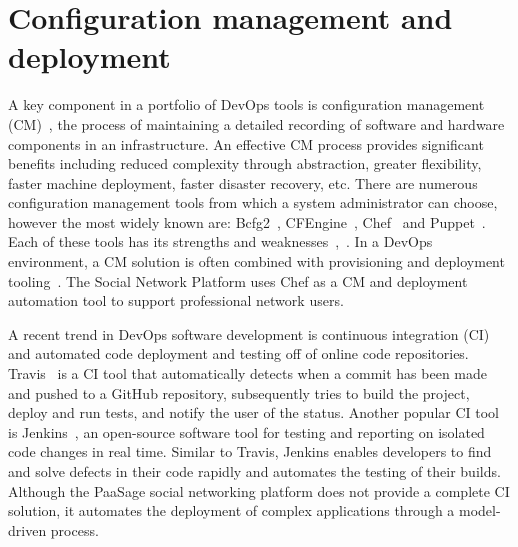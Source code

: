 \section{Configuration management and deployment}
A key component in a portfolio of DevOps tools is configuration management (CM)~\cite{lueninghoener2011getting}, the process of maintaining a detailed recording of software and hardware components in an infrastructure. An effective CM process provides significant benefits including reduced complexity through abstraction, greater flexibility, faster machine deployment, faster disaster recovery, etc. There are numerous configuration management tools from which a system administrator can choose, however the most widely known are: Bcfg2~\cite{Bcfg2}, CFEngine~\cite{CFEngine}, Chef~\cite{Chef_base} and Puppet~\cite{Puppet}. Each of these tools has its strengths and weaknesses~\cite{tsalolikhin2010summary},~\cite{Delaet2010a}. In a DevOps environment, a CM solution is often combined with provisioning and deployment tooling~\cite{ibm-devops}. The Social Network Platform uses Chef as a CM and deployment automation tool to support professional network users.

A recent trend in DevOps software development is continuous integration (CI)~\cite{fowler2006continuous} and automated code deployment and testing off of online code repositories. Travis~\cite{travis_url} is a CI tool that automatically detects when a commit has been made and pushed to a GitHub repository, subsequently tries to build the project, deploy and run tests, and notify the user of the status. Another popular CI tool is Jenkins~\cite{jenkins_url}, an open-source software tool for testing and reporting on isolated code changes in real time. Similar to Travis, Jenkins enables developers to find and solve defects in their code rapidly and automates the testing of their builds. Although the PaaSage social networking platform does not provide a complete CI solution, it automates the deployment of complex applications through a model-driven process.
